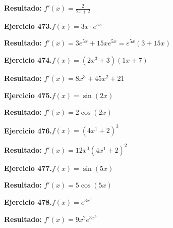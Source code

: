 \documentclass[10pt,a4paper]{article}
\begin{document}
\begin{solbox}
\textbf{Resultado:} \(\displaystyle f'(x) = \frac{2}{2x + 2}\)
\end{solbox}

\begin{ejbox}
\textbf{Ejercicio 473.}\quad $f(x) = 3x \cdot e^{5x}$
\end{ejbox}

\begin{solbox}
\textbf{Resultado:} \(\displaystyle f'(x) = 3e^{5x} + 15xe^{5x} = e^{5x}(3 + 15x)\)
\end{solbox}

\begin{ejbox}
\textbf{Ejercicio 474.}\quad $f(x) = (2x^{3} +3)(1x +7)$
\end{ejbox}

\begin{solbox}
\textbf{Resultado:} \(\displaystyle f'(x) = 8x^{3} +45x^{2} +21\)
\end{solbox}

\newpage
\begin{ejbox}
\textbf{Ejercicio 475.}\quad $f(x) = \sin(2x)$
\end{ejbox}

\begin{solbox}
\textbf{Resultado:} \(\displaystyle f'(x) = 2\cos(2x)\)
\end{solbox}

\begin{ejbox}
\textbf{Ejercicio 476.}\quad $f(x) = (4x^{1} +2)^{3}$
\end{ejbox}

\begin{solbox}
\textbf{Resultado:} \(\displaystyle f'(x) = 12x^{0}(4x^{1} +2)^{2}\)
\end{solbox}

\begin{ejbox}
\textbf{Ejercicio 477.}\quad $f(x) = \sin(5x)$
\end{ejbox}

\begin{solbox}
\textbf{Resultado:} \(\displaystyle f'(x) = 5\cos(5x)\)
\end{solbox}

\newpage
\begin{ejbox}
\textbf{Ejercicio 478.}\quad $f(x) = e^{3x^{3}}$
\end{ejbox}

\begin{solbox}
\textbf{Resultado:} \(\displaystyle f'(x) = 9x^{2}e^{3x^{3}}\)
\end{solbox}
\end{document}
